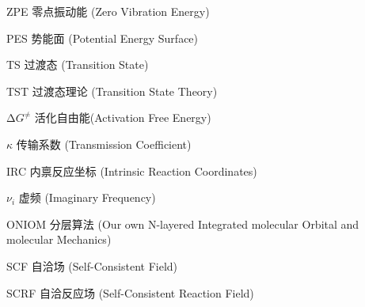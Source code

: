 \documentclass{thuthesis}
\begin{document}
\begin{denotation}[3cm]
  \item[ZPE] 零点振动能 (Zero Vibration Energy)
  \item[PES] 势能面 (Potential Energy Surface)
  \item[TS] 过渡态 (Transition State)
  \item[TST] 过渡态理论 (Transition State Theory)
  \item[$\increment G^\neq$] 活化自由能(Activation Free Energy)
  \item[$\kappa$] 传输系数 (Transmission Coefficient)
  \item[IRC] 内禀反应坐标 (Intrinsic Reaction Coordinates)
  \item[$\nu_i$] 虚频 (Imaginary Frequency)
  \item[ONIOM] 分层算法 (Our own N-layered Integrated molecular Orbital and molecular Mechanics)
  \item[SCF] 自洽场 (Self-Consistent Field)
  \item[SCRF] 自洽反应场 (Self-Consistent Reaction Field)
\end{denotation}

\clearpage
\OMIT
\end{document}
